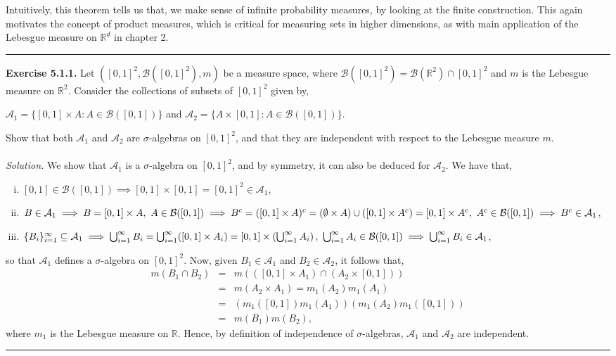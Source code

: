 \documentclass{article}
\begin{document}
Intuitively, this theorem tells us that, we make sense of infinite probability measures, by looking at the finite construction. This again motivates the concept of product measures, which is critical for measuring sets in higher dimensions, as with main application of the Lebesgue measure on $\mathbb{R}^d$ in chapter 2.
\begin{center}
	\noindent\rule{12cm}{0.4pt}
\end{center}
\textbf{Exercise 5.1.1.} Let $([0,1]^2, \mathcal{B}([0,1]^2), m)$ be a measure space, where $\mathcal{B}([0,1]^2) = \mathcal{B}(\mathbb{R}^2)\cap[0,1]^2$ and $m$ is the Lebesgue measure on $\mathbb{R}^2$. Consider the collections of subsets of $[0,1]^2$ given by,
\begin{center}
	$\mathcal{A}_1 = \{[0,1] \times A: A \in \mathcal{B}([0,1])\}$ and $\mathcal{A}_2 = \{A \times [0,1]: A \in \mathcal{B}([0,1])\}$.
\end{center}
Show that both $\mathcal{A}_1$ and $\mathcal{A}_2$ are $\sigma$-algebras on $[0,1]^2$, and that they are independent with respect to the Lebesgue measure $m$.\\\\
\textit{Solution.} We show that $\mathcal{A}_1$ is a $\sigma$-algebra on $[0,1]^2$, and by symmetry, it can also be deduced for $\mathcal{A}_2$. We have that,
\begin{enumerate}[(i)]
	\item $[0,1] \in \mathcal{B}([0,1]) \implies [0,1] \times [0,1] = [0,1]^2 \in \mathcal{A}_1$,
	\item $B \in \mathcal{A}_1 \implies B = [0,1] \times A, \ A \in \mathcal{B}([0,1]) \\ \implies B^c = ([0,1] \times A)^c = (\emptyset \times A) \cup ([0,1] \times A^c) = [0,1] \times A^c, \ A^c \in \mathcal{B}([0,1]) \implies B^c \in \mathcal{A}_1$,
	\item $\{B_i\}_{i=1}^{\infty} \subseteq \mathcal{A}_1 \implies \bigcup_{i=1}^{\infty}B_i = \bigcup_{i=1}^{\infty}([0,1] \times A_i) = [0,1] \times \left(\bigcup_{i=1}^{\infty}A_i\right), \ \bigcup_{i=1}^{\infty}A_i \in \mathcal{B}([0,1]) \\ \implies \bigcup_{i=1}^{\infty}B_i \in \mathcal{A}_1$,
\end{enumerate}
so that $\mathcal{A}_1$ defines a $\sigma$-algebra on $[0,1]^2$. Now, given $B_1 \in \mathcal{A}_1$ and $B_2 \in \mathcal{A}_2$, it follows that,
\begin{eqnarray}
\nonumber
m(B_1 \cap B_2) &=& m(([0,1] \times A_1) \cap (A_2 \times [0,1])) \\
\nonumber
&=& m(A_2 \times A_1) = m_1(A_2)m_1(A_1) \\
\nonumber
&=& (m_1([0,1])m_1(A_1))(m_1(A_2)m_1([0,1])) \\
\nonumber
&=& m(B_1)m(B_2),
\end{eqnarray}
where $m_1$ is the Lebesgue measure on $\mathbb{R}$. Hence, by definition of independence of $\sigma$-algebras, $\mathcal{A}_1$ and $\mathcal{A}_2$ are independent.
\begin{center}
	\noindent\rule{12cm}{0.4pt}
\end{center}
\end{document}
